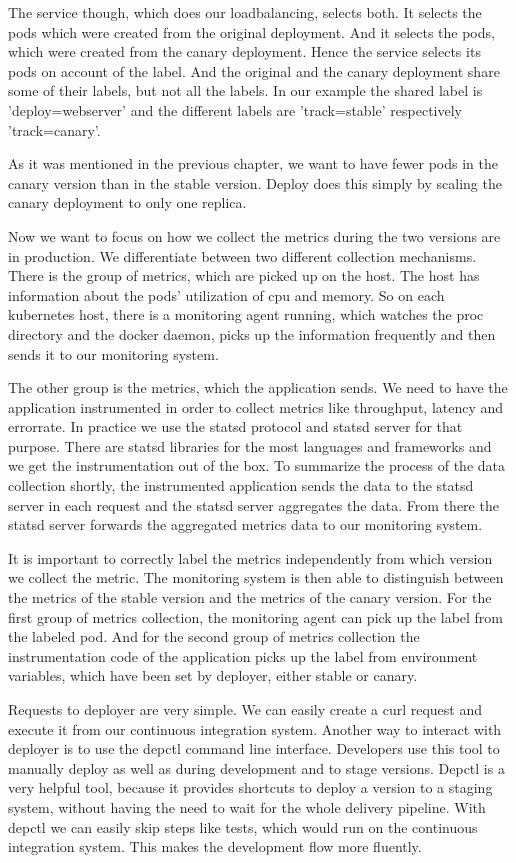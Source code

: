 The service though, which does our loadbalancing, selects both. It selects the pods which
were created from the original deployment. And it selects the pods, which were created
from the canary deployment. Hence the service selects its pods on account of the
label. And the original and the canary deployment share some of their labels, but not all
the labels. In our example the shared label is 'deploy=webserver' and the different labels
are 'track=stable' respectively 'track=canary'.

As it was mentioned in the previous chapter, we want to have fewer pods in the canary
version than in the stable version. Deploy does this simply by scaling the canary
deployment to only one replica.

Now we want to focus on how we collect the metrics during the two versions are in
production. We differentiate between two different collection mechanisms. There is the
group of metrics, which are picked up on the host. The host has information about the
pods' utilization of cpu and memory. So on each kubernetes host, there is a monitoring
agent running, which watches the proc directory and the docker daemon, picks up the
information frequently and then sends it to our monitoring system.

The other group is the metrics, which the application sends. We need to have the
application instrumented in order to collect metrics like throughput, latency and
errorrate. In practice we use the statsd protocol and statsd server for that
purpose. There are statsd libraries for the most languages and frameworks and we get the
instrumentation out of the box. To summarize the process of the data collection shortly,
the instrumented application sends the data to the statsd server in each request and the
statsd server aggregates the data. From there the statsd server forwards the aggregated
metrics data to our monitoring system.

It is important to correctly label the metrics independently from which version we collect
the metric. The monitoring system is then able to distinguish between the metrics of the
stable version and the metrics of the canary version. For the first group of metrics
collection, the monitoring agent can pick up the label from the labeled pod. And for the
second group of metrics collection the instrumentation code of the application picks up
the label from environment variables, which have been set by deployer, either stable or
canary.

Requests to deployer are very simple. We can easily create a curl request and execute it
from our continuous integration system. Another way to interact with deployer is to use
the depctl command line interface. Developers use this tool to manually deploy as well as
during development and to stage versions. Depctl is a very helpful tool, because it
provides shortcuts to deploy a version to a staging system, without having the need to
wait for the whole delivery pipeline. With depctl we can easily skip steps like
tests, which would run on the continuous integration system. This makes the development
flow more fluently.

